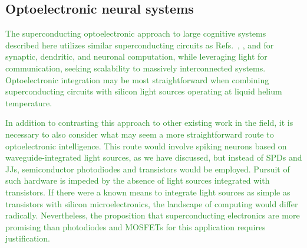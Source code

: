 \documentclass[twocolumn]{article}
\newcommand{\onlinecite}[1]{\hspace{-1 ex} \nocite{#1}\citenum{#1}}
\begin{document}
\subsection{Optoelectronic neural systems}
\textcolor{ForestGreen}{The superconducting optoelectronic approach to large cognitive systems described here utilizes similar superconducting circuits as Refs.\,\onlinecite{hias2007},\onlinecite{sele2017}, and \onlinecite{scdo2018} for synaptic, dendritic, and neuronal computation, while leveraging light for communication, seeking scalability to massively interconnected systems. Optoelectronic integration may be most straightforward when combining superconducting circuits with silicon light sources operating at liquid helium temperature.}

\textcolor{ForestGreen}{In addition to contrasting this approach to other existing work in the field, it is necessary to also consider what may seem a more straightforward route to optoelectronic intelligence. This route would involve spiking neurons based on waveguide-integrated light sources, as we have discussed, but instead of SPDs and JJs, semiconductor photodiodes and transistors would be employed. Pursuit of such hardware is impeded by the absence of light sources integrated with transistors. If there were a known means to integrate light sources as simple as transistors with silicon microelectronics, the landscape of computing would differ radically. Nevertheless, the proposition that superconducting electronics are more promising than photodiodes and MOSFETs for this application requires justification.}
\end{document}
